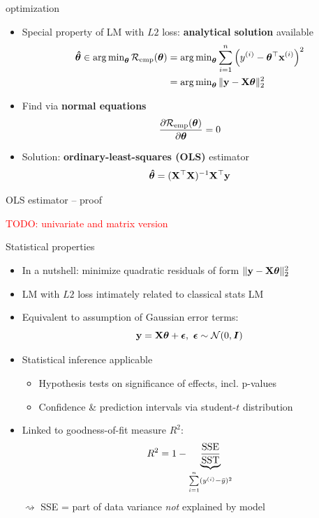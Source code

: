 \documentclass[11pt,compress,t,notes=noshow, xcolor=table]{beamer}
\begin{document}
\begin{vbframe}{optimization}

\begin{itemize}
    \item Special property of LM with $L2$ loss: \textbf{analytical solution}
    available
    \begin{align*}
        \bm{\hat\theta} \in 
        \operatorname{arg\,min}_{\bm{\theta}} \mathcal{R}_{\text{emp}}(\bm{\theta}) &=
        \operatorname{arg\,min}_{\bm{\theta}} \sum\limits_{i=1}^n \left(y^{(i)} - \bm{\theta}^\top \mathbf{x}^{(i)} \right)^2  \\
        &= \operatorname{arg\,min}_{\bm{\theta}} \| \mathbf{y} - \mathbf{X} \bm{\theta} \|^2_2
    \end{align*}
    \normalsize
    \item Find via \textbf{normal equations}
    $$\frac{\partial{\mathcal{R}_{\text{emp}}(\bm{\theta})}}{\partial \bm{\theta}} = 0$$
    \item Solution: \textbf{ordinary-least-squares (OLS)} estimator
    $$\bm{\hat\theta} = (\mathbf{X}^\top \mathbf{X})^{-1} \mathbf{X}^\top \mathbf{y}$$
\end{itemize}

\end{vbframe}


\begin{vbframe}{OLS estimator -- proof}

\textcolor{red}{TODO: univariate and matrix version}

\end{vbframe}


\begin{vbframe}{Statistical properties}

\begin{itemize}
    \item In a nutshell: minimize quadratic residuals of form 
    $\| \mathbf{y} - \mathbf{X} \bm{\theta} \|^2_2$
    \item LM with $L2$ loss intimately related to classical stats LM
        \item Equivalent to assumption of Gaussian error terms: 
        $$\mathbf{y} = \mathbf{X} \bm{\theta} + \bm{\epsilon}, ~ \bm{\epsilon} \sim 
        \mathcal{N}(0, \boldsymbol{I})$$
        \item Statistical inference applicable
        \begin{itemize}
            \item Hypothesis tests on significance of effects, incl. p-values
            \item Confidence \& prediction intervals via student-$t$ 
            distribution
        \end{itemize}
        \item Linked to goodness-of-fit measure $R^2$:
        $$R^2 = 1 - \underbrace{\frac{\text{SSE}}{\text{SST}}}_{
        \sum\limits_{i=1}^n (y^{(i)} - \bar y)^2}$$
        $\rightsquigarrow$ SSE = part of data variance \textit{not} explained 
        by model
\end{itemize}

\end{vbframe}

\endlecture
\end{document}
